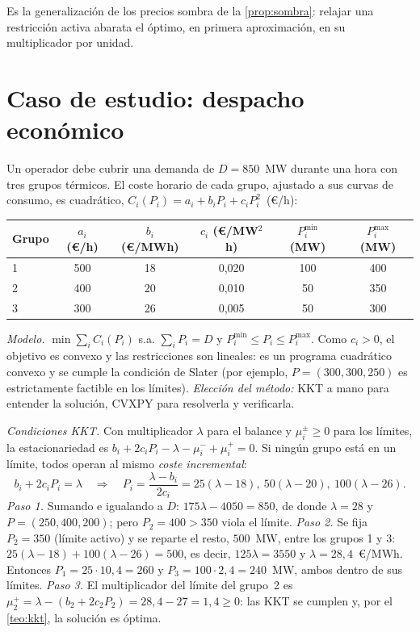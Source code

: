 Es la generalización de los precios sombra de la \cref{prop:sombra}: relajar una restricción activa abarata el óptimo, en primera aproximación, en su multiplicador por unidad.

\section{Caso de estudio: despacho económico}

\begin{ejemplo}\label{ej:despacho}
Un operador debe cubrir una demanda de $D=850$~MW durante una hora con tres grupos térmicos. El coste horario de cada grupo, ajustado a sus curvas de consumo, es cuadrático, $C_i(P_i)=a_i+b_iP_i+c_iP_i^{2}$~(€/h):
\begin{center}\small
\begin{tabular}{@{}lccccc@{}}
\toprule
Grupo & $a_i$ (€/h) & $b_i$ (€/MWh) & $c_i$ (€/MW$^2$h) & $P_i^{\min}$ (MW) & $P_i^{\max}$ (MW) \\
\midrule
1 & 500 & 18 & 0,020 & 100 & 400 \\
2 & 400 & 20 & 0,010 & 50 & 350 \\
3 & 300 & 26 & 0,005 & 50 & 300 \\
\bottomrule
\end{tabular}
\end{center}
\emph{Modelo.} $\min\sum_iC_i(P_i)$ s.a. $\sum_iP_i=D$ y $P_i^{\min}\le P_i\le P_i^{\max}$. Como $c_i>0$, el objetivo es convexo y las restricciones son lineales: es un programa cuadrático convexo y se cumple la condición de Slater (por ejemplo, $P=(300,300,250)$ es estrictamente factible en los límites). \emph{Elección del método:} KKT a mano para entender la solución, CVXPY para resolverla y verificarla.

\emph{Condiciones KKT.} Con multiplicador $\lambda$ para el balance y $\mu_i^{\pm}\ge 0$ para los límites, la estacionariedad es $b_i+2c_iP_i-\lambda-\mu_i^{-}+\mu_i^{+}=0$. Si ningún grupo está en un límite, todos operan al mismo \emph{coste incremental}:
\[
b_i+2c_iP_i=\lambda\quad\Longrightarrow\quad P_i=\frac{\lambda-b_i}{2c_i}=25(\lambda-18),\ 50(\lambda-20),\ 100(\lambda-26).
\]
\emph{Paso 1.} Sumando e igualando a $D$: $175\lambda-4050=850$, de donde $\lambda=28$ y $P=(250,400,200)$; pero $P_2=400>350$ viola el límite.
\emph{Paso 2.} Se fija $P_2=350$ (límite activo) y se reparte el resto, $500$~MW, entre los grupos 1 y 3: $25(\lambda-18)+100(\lambda-26)=500$, es decir, $125\lambda=3550$ y $\lambda=28{,}4$~€/MWh. Entonces $P_1=25\cdot 10{,}4=260$ y $P_3=100\cdot 2{,}4=240$~MW, ambos dentro de sus límites.
\emph{Paso 3.} El multiplicador del límite del grupo~2 es $\mu_2^{+}=\lambda-(b_2+2c_2P_2)=28{,}4-27=1{,}4\ge 0$: las KKT se cumplen y, por el \cref{teo:kkt}, la solución es óptima.


\end{ejemplo}
